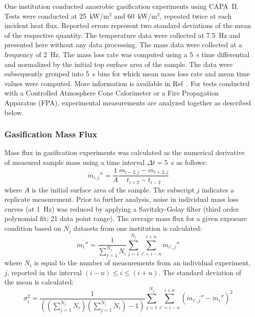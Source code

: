 \documentclass{book}
\begin{document}
One institution conducted anaerobic gasification experiments using CAPA~II. Tests were conducted at 25~kW/m$^2$ and 60~kW/m$^2$, repeated twice at each incident heat flux. Reported errors represent two standard deviations of the mean of the respective quantity. The temperature data were collected at 7.5~Hz and presented here without any data processing. The mass data were collected at a frequency of 2~Hz. The mass loss rate was computed using a 5~s time differential and normalized by the initial top surface area of the sample. The data were subsequently grouped into 5~s bins for which mean mass loss rate and mean time values were computed. More information is available in Ref~\cite{fiola2020comparison}. For tests conducted with a Controlled Atmosphere Cone Calorimeter or a Fire Propagation Apparatus (FPA), experimental measurements are analyzed together as described below.

\subsubsection{Gasification Mass Flux}

Mass flux in gasification experiments was calculated as the numerical derivative of measured sample mass using a time interval $\Delta t=5$~s as follows:
\begin{equation}
   \dot{m}_{i,j}'' = \frac{1}{A} \frac{\dot{m}_{i-2,j}-\dot{m}_{i+2,j}}{t_{i+2}-t_{i-2}}
\end{equation}
where $A$ is the initial surface area of the sample. The subscript $j$ indicates a replicate measurement. Prior to further analysis, noise in individual mass loss curves (at 1~Hz) was reduced by applying a Savitzky-Golay filter (third order polynomial fit; 21 data point range). The average mass flux for a given exposure condition based on $N_j$ datasets from one institution is calculated:
\begin{equation}
   \overline{\dot{m}_i''} = \frac{1}{\sum_{j=1}^{N_j}{N_i}} \sum_{j=1}^{N_j} \sum_{i'=i-n}^{i+n} \dot{m}_{i',j}''
\end{equation}
where $N_i$ is equal to the number of measurements from an individual experiment, $j$, reported in the interval $(i-n) \leq i \leq (i+n)$. The standard deviation of the mean is calculated:
\begin{equation}
   \sigma_i^2 = \frac{1}{(({\sum_{j=1}^{N_j}{N_i}})({\sum_{j=1}^{N_j}{N_i}})-1)} \sum_{j=1}^{N_j} \sum_{i'=i-n}^{i+n} \left( \dot{m}_{i',j}'' - \overline{\dot{m}_i''} \right)^2
\end{equation}
\end{document}

